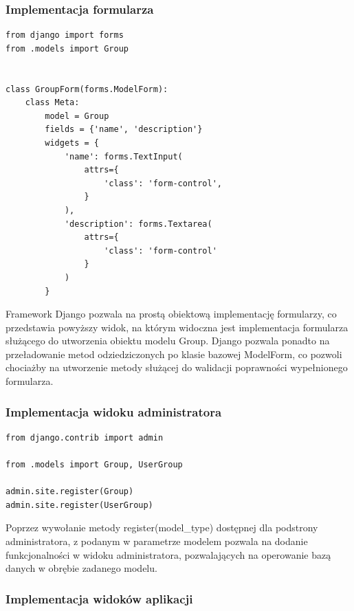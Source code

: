 \documentclass[12pt]{article}
\begin{document}
\subsubsection{Implementacja formularza}

\begin{lstlisting}[caption={groups/forms.py}]
from django import forms
from .models import Group


class GroupForm(forms.ModelForm):
    class Meta:
        model = Group
        fields = {'name', 'description'}
        widgets = {
            'name': forms.TextInput(
                attrs={
                    'class': 'form-control',
                }
            ),
            'description': forms.Textarea(
                attrs={
                    'class': 'form-control'
                }
            )
        }
\end{lstlisting}

    Framework Django pozwala na prostą obiektową implementację formularzy, co przedstawia powyższy widok, na którym widoczna jest implementacja formularza służącego do utworzenia obiektu modelu Group. Django pozwala ponadto na przeładowanie metod odziedziczonych po klasie bazowej ModelForm, co pozwoli chociażby na utworzenie metody służącej do walidacji poprawności wypełnionego formularza.  

\subsubsection{Implementacja widoku administratora}

\begin{lstlisting}[caption={groups/admin.py}]
from django.contrib import admin

from .models import Group, UserGroup

admin.site.register(Group)
admin.site.register(UserGroup)
\end{lstlisting}

Poprzez wywołanie metody register(model\_type) dostępnej dla podstrony administratora, z podanym w parametrze modelem pozwala na dodanie funkcjonalności w widoku administratora, pozwalających na operowanie bazą danych w obrębie zadanego modelu.


\subsubsection{Implementacja widoków aplikacji}
\end{document}
